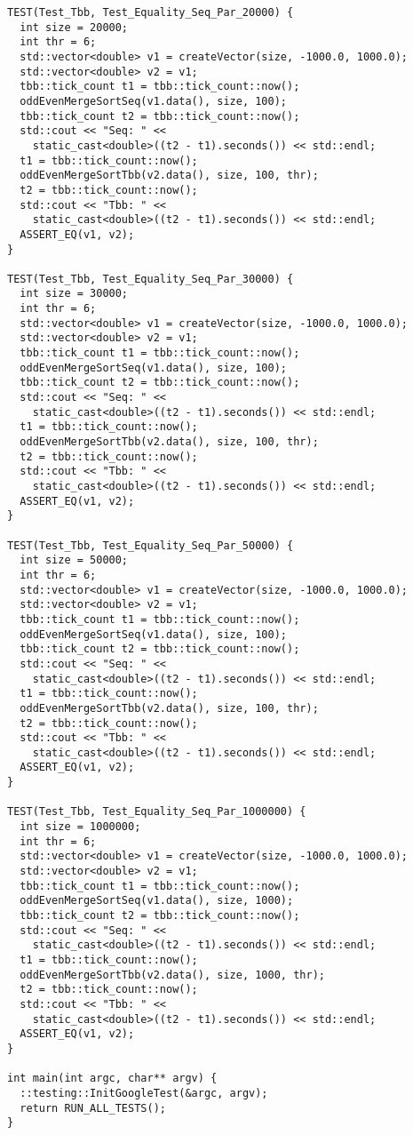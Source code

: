 \documentclass{report}
\begin{document}
\begin{lstlisting}
TEST(Test_Tbb, Test_Equality_Seq_Par_20000) {
  int size = 20000;
  int thr = 6;
  std::vector<double> v1 = createVector(size, -1000.0, 1000.0);
  std::vector<double> v2 = v1;
  tbb::tick_count t1 = tbb::tick_count::now();
  oddEvenMergeSortSeq(v1.data(), size, 100);
  tbb::tick_count t2 = tbb::tick_count::now();
  std::cout << "Seq: " <<
    static_cast<double>((t2 - t1).seconds()) << std::endl;
  t1 = tbb::tick_count::now();
  oddEvenMergeSortTbb(v2.data(), size, 100, thr);
  t2 = tbb::tick_count::now();
  std::cout << "Tbb: " <<
    static_cast<double>((t2 - t1).seconds()) << std::endl;
  ASSERT_EQ(v1, v2);
}

TEST(Test_Tbb, Test_Equality_Seq_Par_30000) {
  int size = 30000;
  int thr = 6;
  std::vector<double> v1 = createVector(size, -1000.0, 1000.0);
  std::vector<double> v2 = v1;
  tbb::tick_count t1 = tbb::tick_count::now();
  oddEvenMergeSortSeq(v1.data(), size, 100);
  tbb::tick_count t2 = tbb::tick_count::now();
  std::cout << "Seq: " <<
    static_cast<double>((t2 - t1).seconds()) << std::endl;
  t1 = tbb::tick_count::now();
  oddEvenMergeSortTbb(v2.data(), size, 100, thr);
  t2 = tbb::tick_count::now();
  std::cout << "Tbb: " <<
    static_cast<double>((t2 - t1).seconds()) << std::endl;
  ASSERT_EQ(v1, v2);
}

TEST(Test_Tbb, Test_Equality_Seq_Par_50000) {
  int size = 50000;
  int thr = 6;
  std::vector<double> v1 = createVector(size, -1000.0, 1000.0);
  std::vector<double> v2 = v1;
  tbb::tick_count t1 = tbb::tick_count::now();
  oddEvenMergeSortSeq(v1.data(), size, 100);
  tbb::tick_count t2 = tbb::tick_count::now();
  std::cout << "Seq: " <<
    static_cast<double>((t2 - t1).seconds()) << std::endl;
  t1 = tbb::tick_count::now();
  oddEvenMergeSortTbb(v2.data(), size, 100, thr);
  t2 = tbb::tick_count::now();
  std::cout << "Tbb: " <<
    static_cast<double>((t2 - t1).seconds()) << std::endl;
  ASSERT_EQ(v1, v2);
}

TEST(Test_Tbb, Test_Equality_Seq_Par_1000000) {
  int size = 1000000;
  int thr = 6;
  std::vector<double> v1 = createVector(size, -1000.0, 1000.0);
  std::vector<double> v2 = v1;
  tbb::tick_count t1 = tbb::tick_count::now();
  oddEvenMergeSortSeq(v1.data(), size, 1000);
  tbb::tick_count t2 = tbb::tick_count::now();
  std::cout << "Seq: " <<
    static_cast<double>((t2 - t1).seconds()) << std::endl;
  t1 = tbb::tick_count::now();
  oddEvenMergeSortTbb(v2.data(), size, 1000, thr);
  t2 = tbb::tick_count::now();
  std::cout << "Tbb: " <<
    static_cast<double>((t2 - t1).seconds()) << std::endl;
  ASSERT_EQ(v1, v2);
}

int main(int argc, char** argv) {
  ::testing::InitGoogleTest(&argc, argv);
  return RUN_ALL_TESTS();
}
\end{lstlisting}
\end{document}
